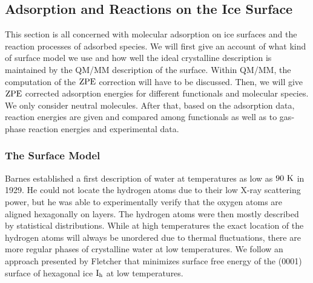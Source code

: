 \subsection{Adsorption and Reactions on the Ice Surface}
\label{Sec:Ads}

This section is all concerned with molecular adsorption on ice surfaces
and the reaction processes of adsorbed species. We will first give an
account of what kind of surface model we use and how well the ideal
crystalline description is maintained by the QM/MM description of
the surface. Within QM/MM, the computation of the $\text{ZPE}$ correction 
will have to be discussed. Then, we will give $\text{ZPE}$ corrected adsorption
energies for different functionals and molecular species. We only consider
neutral molecules.
After that, based on the adsorption data, reaction energies are given
and compared among functionals as well as to gas-phase reaction
energies and experimental data.

\subsubsection{The Surface Model}
\label{Sec:Ads:Model}

Barnes established a first description of water at temperatures as low as $90{~\text{K}}$
in 1929.\cite{Barnes1929} He could not locate the hydrogen atoms due
to their low X-ray scattering power,\cite{Fletcher1966} but he was able
to experimentally verify that the oxygen atoms are aligned hexagonally
on layers. The hydrogen atoms were then mostly described by statistical
distributions. While at high temperatures the exact location of the hydrogen
atoms will always be unordered due to thermal fluctuations, there are
more regular phases of crystalline water at low temperatures.
We follow an approach presented by Fletcher that minimizes
surface free energy of the (0001) surface of hexagonal ice $\text I_\text h$ at low
temperatures.\cite{Fletcher1992}

